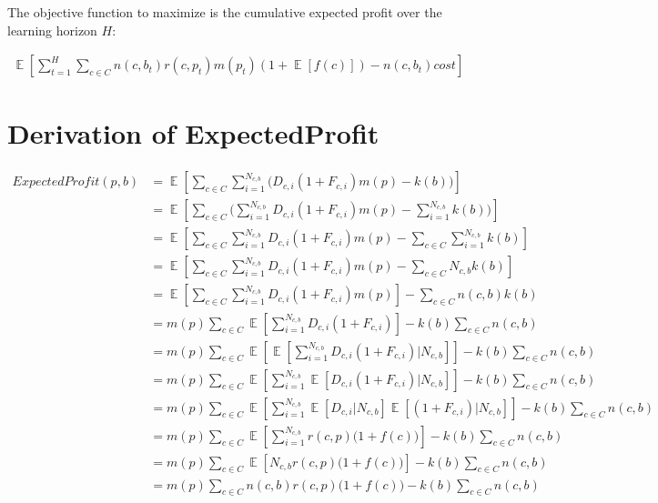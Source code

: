 \documentclass[11pt]{article} %
\DeclareMathOperator{\EX}{\mathbb{E}}
\begin{document}
The objective function to maximize is the cumulative expected profit over the learning horizon $H$:

\begin{align*}
\EX\left[\sum_{t=1}^H{\sum_{c \in C}{n(c,b_t)r(c,p_t)m(p_t)(1+\EX[f(c)])-n(c,b_t)cost}}\right]
\end{align*}

\appendix
\section{Derivation of ExpectedProfit}\label{sec.DerExpProf}
\begin{align*}
ExpectedProfit(p,b) 
&= \EX\left[\sum_{c \in C}{\sum_{i =1}^{N_{c,b}}{\bigg( D_{c,i}(1+F_{c,i})m(p)-k(b)\bigg)}}\right]\\
&= \EX\left[\sum_{c \in C}{\bigg(\sum_{i =1}^{N_{c,b}}{ D_{c,i}(1+F_{c,i})m(p)}-\sum_{i =1}^{N_{c,b}}k(b)\bigg)}\right]\\
&= \EX\left[\sum_{c \in C}{\sum_{i =1}^{N_{c,b}}{ D_{c,i}(1+F_{c,i})m(p)}}-\sum_{c \in C}{\sum_{i =1}^{N_{c,b}}k(b)}\right]\\
&= \EX\left[\sum_{c \in C}{\sum_{i =1}^{N_{c,b}}{ D_{c,i}(1+F_{c,i})m(p)}}-\sum_{c \in C}{N_{c,b}k(b)}\right]\\
&= \EX\left[\sum_{c \in C}{\sum_{i =1}^{N_{c,b}}{ D_{c,i}(1+F_{c,i})m(p)}}\right]-\sum_{c \in C}{n(c,b)k(b)}\\
&= m(p)\sum_{c \in C}{\EX\left[\sum_{i =1}^{N_{c,b}}{ D_{c,i}(1+F_{c,i})}\right]}-k(b)\sum_{c \in C}{n(c,b)}\\
&= m(p)\sum_{c \in C}{\EX\left[\EX\left[\sum_{i =1}^{N_{c,b}}{ D_{c,i}(1+F_{c,i})}\Bigg|N_{c,b}\right]\right]}-k(b)\sum_{c \in C}{n(c,b)}\\
&= m(p)\sum_{c \in C}{\EX\left[\sum_{i =1}^{N_{c,b}}{\EX\left[D_{c,i}(1+F_{c,i})\bigg|N_{c,b}\right]}\right]}-k(b)\sum_{c \in C}{n(c,b)}\\
&= m(p)\sum_{c \in C}{\EX\left[\sum_{i =1}^{N_{c,b}}{\EX\left[D_{c,i}\bigg|N_{c,b}\right]\EX\left[(1+F_{c,i})\bigg|N_{c,b}\right]}\right]}-k(b)\sum_{c \in C}{n(c,b)}\\
&= m(p)\sum_{c \in C}{\EX\left[\sum_{i =1}^{N_{c,b}}{r(c,p)\Big(1+f(c)\Big)}\right]}-k(b)\sum_{c \in C}{n(c,b)}\\
&= m(p)\sum_{c \in C}{\EX\left[N_{c,b}r(c,p)\Big(1+f(c)\Big)\right]}-k(b)\sum_{c \in C}{n(c,b)}\\
&= m(p)\sum_{c \in C}{n(c,b)r(c,p)\Big(1+f(c)\Big)}-k(b)\sum_{c \in C}{n(c,b)}
\end{align*}
\end{document}
